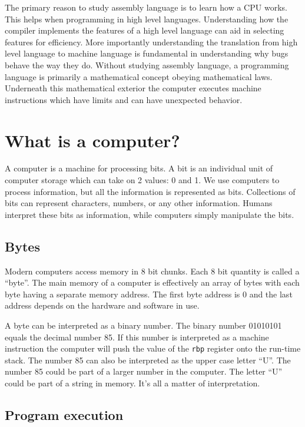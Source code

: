 \documentclass[11pt,b5paper]{book}
\begin{document}
The primary reason to study assembly language is to learn how a CPU works.
This helps when programming in high level languages.
Understanding how the compiler implements the features of a high level
language can aid in selecting features for efficiency.
More importantly understanding the translation from high level language to
machine language is fundamental in understanding why bugs behave the way they
do.
Without studying assembly language, a programming language is primarily a
mathematical concept obeying mathematical laws.
Underneath this mathematical exterior the computer executes machine instructions which have limits and can have unexpected behavior.

\section{What is a computer?}

A computer is a machine for processing bits.
A bit  is an individual unit of computer storage which can take on 2 values: 0 and 1.
We use computers to process information, but all the information is
represented as bits.
Collections of bits can represent characters, numbers, or any other information.
Humans interpret these bits as information, while computers simply manipulate
the bits.

\subsection{Bytes}

Modern computers access memory in 8 bit chunks.  Each 8 bit quantity is called
a ``byte''. 
The main memory of a computer is effectively an array of bytes with
each byte having a separate memory address.
The first byte address is 0 and the last address depends on the hardware and software in use.

A byte can be interpreted as a binary number.
The binary  number 01010101 equals the decimal number 85.
If this number is interpreted as a machine instruction the computer will push
the value of the {\tt rbp} register  onto the run-time stack.
The number 85 can also be interpreted as the upper case letter ``U''.
The number 85 could be part of a larger number in the computer.
The letter ``U'' could be part of a string in memory.
It's all a matter of interpretation.

\subsection{Program execution}
\end{document}
